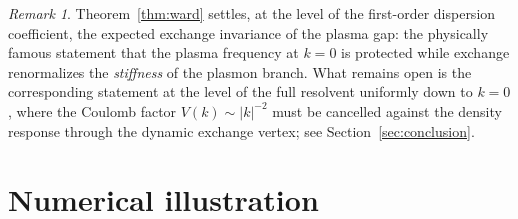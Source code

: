 \documentclass[11pt,a4paper]{amsart}
\theoremstyle{definition}
\theoremstyle{remark}
\newtheorem{remark}[theorem]{Remark}
\begin{document}
\begin{remark}\label{rem:wardmeaning}
Theorem~\ref{thm:ward} settles, at the level of the first-order dispersion coefficient, the expected exchange invariance of the plasma gap: the physically famous statement that the plasma frequency at $k=0$ is protected while exchange renormalizes the \emph{stiffness} of the plasmon branch. What remains open is the corresponding statement at the level of the full resolvent uniformly down to $k=0$, where the Coulomb factor $V(k)\sim|k|^{-2}$ must be cancelled against the density response through the dynamic exchange vertex; see Section~\ref{sec:conclusion}.
\end{remark}

\section{Numerical illustration}\label{sec:numerics}
\end{document}
